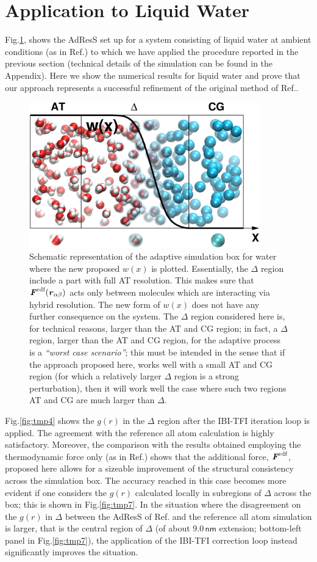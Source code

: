 \documentclass[aps,pre,preprint]{revtex4}
\newcommand{\redc}[1]{{\color{red} #1}}
\renewcommand{\v}[1]{\textbf{\textit{#1}}}
\begin{document}
\section{Application to Liquid Water}
Fig.\ref{adapt-wat}, shows the AdResS set up for a system consisting of liquid water at ambient conditions (as in Ref.\cite{prlgc}) to which we have applied the procedure reported in the previous section (technical details of the simulation can be found in the Appendix). Here we show the numerical results for liquid water and prove that our approach represents a successful refinement of the original method of Ref.\cite{prlgc}. 
\begin{figure}
  \centering
  \includegraphics[angle=0,width=10cm]{adapt-wat.eps}
  \caption{Schematic representation of the adaptive simulation box for water where the new proposed $w(x)$ is plotted. Essentially, the $\Delta$ region include a part with full AT resolution. This makes sure that $\v F^{\textrm{rdf}}(\v r_{\alpha\beta})$ acts only between molecules which are interacting via hybrid resolution. The new form of $w(x)$ does not have any further consequence on the system. The $\Delta$ region considered here is, for technical reasons, larger than the AT and CG region; in fact, a $\Delta$ region, larger than the AT and CG region, for the adaptive process is a {\it ``worst case scenario''}; \redc{ this must be intended in the sense that if the approach proposed here, works well with a small AT and CG region (for which a relatively larger $\Delta$ region is a strong perturbation), then it will work well the case where such two regions AT and CG are much larger than $\Delta$.}}
  \label{adapt-wat}
\end{figure}
Fig.\ref{fig:tmp4} shows the $g(r)$ in the $\Delta$ region after the IBI-TFI iteration loop is applied. The agreement with the reference all atom calculation is highly satisfactory. Moreover, the comparison with the results obtained employing the thermodynamic force only (as in Ref.\cite{prlgc}) shows that the additional force, $\v F^{\textrm{rdf}}$, proposed here allows for a sizeable improvement of the structural consistency across the simulation box. The accuracy reached in this case becomes more evident if one considers the $g(r)$ calculated locally in subregions of $\Delta$ across the box; this is shown in Fig.\ref{fig:tmp7}. In the situation where the disagreement on the $g(r)$ in $\Delta$ between the AdResS of Ref.\cite{prlgc} and the reference all atom simulation is larger, that is the central region of $\Delta$ (of about $9.0\, \textsf{nm}$ extension; bottom-left panel in Fig.\ref{fig:tmp7}), the application of the  IBI-TFI correction loop instead significantly improves the situation. 
\end{document}
